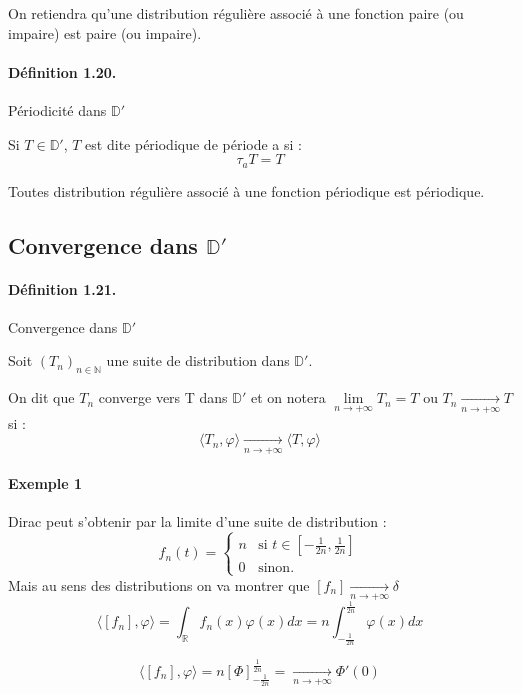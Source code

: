 \documentclass[12pt,a4paper]{report}
\newcommand{\ens}[1]{\mathbb{#1}}
\begin{document}
On retiendra qu'une distribution régulière associé à une fonction paire (ou impaire) est paire (ou impaire).

\paragraph{Définition 1.20.} Périodicité dans \(\ens{D'}\)

Si \(T \in \ens{D'}\), \(T\) est dite périodique de période a si :
\[
	\tau_a T = T
\]

Toutes distribution régulière associé à une fonction périodique est périodique.

\subsection{Convergence dans \(\ens{D'}\)}

\paragraph{Définition 1.21.} Convergence dans \(\ens{D'}\)

Soit \((T_n)_{n\in\ens{N}}\) une suite de distribution dans \(\ens{D'}\).

On dit que \(T_n\) converge vers T dans \(\ens{D'}\) et on notera \(\underset{n \rightarrow +\infty}{\lim} T_n = T\) ou \(T_n \underset{n \rightarrow +\infty}{\rightarrow} T\) si :
\[
	\langle T_n, \varphi \rangle \underset{n \rightarrow +\infty}{\rightarrow} \langle T, \varphi \rangle
\]

\paragraph{Exemple 1} Dirac peut s'obtenir par la limite d'une suite de distribution :
\[
	f_n(t) = \left\{
    \begin{array}{ll}
        n & \mbox{si } t \in [-\frac{1}{2n}, \frac{1}{2n}] \\
        0 & \mbox{sinon.}
    \end{array}
\right.
\]
Mais au sens des distributions on va montrer que \([f_n] \underset{n \rightarrow +\infty}{\rightarrow} \delta\)
\[
	\langle [f_n], \varphi \rangle = \int_{\ens{R}} f_n(x) \varphi(x) dx = n \int_{-\frac{1}{2n}}^{\frac{1}{2n}} \varphi(x) dx
\]

\[
	\langle [f_n], \varphi \rangle = n \left[ \Phi \right]_{-\frac{1}{2n}}^{\frac{1}{2n}} = \underset{n \rightarrow +\infty}{\rightarrow} \Phi' (0)
\]
\end{document}

